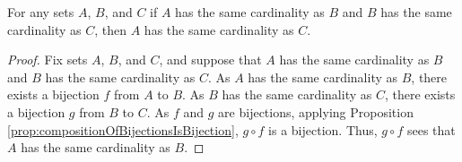 \guard




\begin{prop}
\label{prop:cardinalityIsTransitive}
  For any sets $A$, $B$, and $C$ if $A$ has the same cardinality as $B$ and $B$ has the same cardinality as $C$, then $A$ has the same cardinality as $C$.
\end{prop}
\begin{proof}
  Fix sets $A$, $B$, and $C$, and suppose that $A$ has the same cardinality as $B$ and $B$ has the same cardinality as $C$.
  As $A$ has the same cardinality as $B$, there exists a bijection $f$ from $A$ to $B$.
  As $B$ has the same cardinality as $C$, there exists a bijection $g$ from $B$ to $C$.
  As $f$ and $g$ are bijections, applying Proposition \ref{prop:compositionOfBijectionsIsBijection}, $g\circ f$ is a bijection.
  Thus, $g\circ f$ sees that $A$ has the same cardinality as $B$.
\end{proof}
